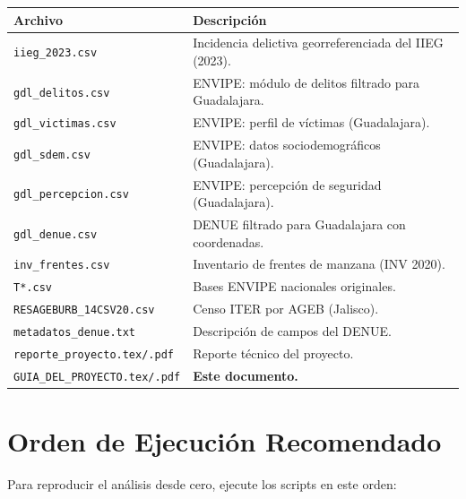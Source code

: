\documentclass[12pt, a4paper]{article}
\begin{document}
\begin{table}[h!]
\centering
\small
\begin{tabular}{p{5.5cm} p{8.5cm}}
\toprule
\textbf{Archivo} & \textbf{Descripción} \\
\midrule
\texttt{iieg\_2023.csv} & Incidencia delictiva georreferenciada del IIEG (2023). \\
\texttt{gdl\_delitos.csv} & ENVIPE: módulo de delitos filtrado para Guadalajara. \\
\texttt{gdl\_victimas.csv} & ENVIPE: perfil de víctimas (Guadalajara). \\
\texttt{gdl\_sdem.csv} & ENVIPE: datos sociodemográficos (Guadalajara). \\
\texttt{gdl\_percepcion.csv} & ENVIPE: percepción de seguridad (Guadalajara). \\
\texttt{gdl\_denue.csv} & DENUE filtrado para Guadalajara con coordenadas. \\
\texttt{inv\_frentes.csv} & Inventario de frentes de manzana (INV 2020). \\
\texttt{T*.csv} & Bases ENVIPE nacionales originales. \\
\texttt{RESAGEBURB\_14CSV20.csv} & Censo ITER por AGEB (Jalisco). \\
\texttt{metadatos\_denue.txt} & Descripción de campos del DENUE. \\
\addlinespace
\texttt{reporte\_proyecto.tex/.pdf} & Reporte técnico del proyecto. \\
\texttt{GUIA\_DEL\_PROYECTO.tex/.pdf} & \textbf{Este documento.} \\
\bottomrule
\end{tabular}
\end{table}

\section{Orden de Ejecución Recomendado}

Para reproducir el análisis desde cero, ejecute los scripts en este orden:
\end{document}
